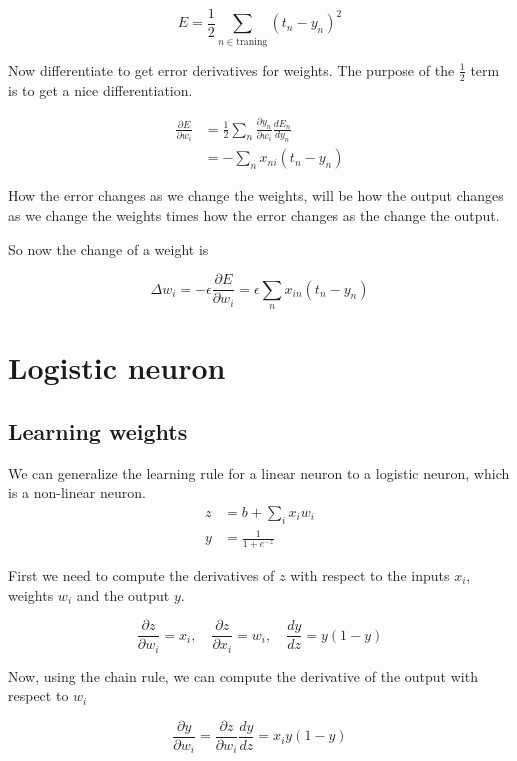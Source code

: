 \documentclass{article}
\begin{document}
\[
    E=\frac{1}{2} \sum_{n\in \text{traning}} {(t_n - y_n)}^2
\]

Now differentiate to get error derivatives for weights. The purpose of the \(\frac{1}{2}\) term is to get a nice differentiation.

\begin{align*}
    \frac{\partial E}{\partial w_i}&=
    \frac{1}{2} \sum_n \frac{\partial y_n}{\partial w_i} \frac{dE_n}{dy_n} \\
    &= - \sum_n x_{ni} (t_n-y_n)
\end{align*}

How the error changes as we change the weights, will be how the output changes as we change the weights
times how the error changes as the change the output.

So now the change of a weight is

\[
    \Delta w_i=-\epsilon \frac{\partial E}{\partial w_i} = \epsilon \sum_n x_{in}(t_n-y_n)
\]



\pagebreak

\section{Logistic neuron}

\subsection{Learning weights}

We can generalize the learning rule for a linear neuron to a logistic neuron, which is a non-linear neuron.
\\
\begin{align*}    
    z&=b+\sum_{i} x_i w_i \\
    y&=\frac{1}{1+e^{-z}}
\end{align*}

First we need to compute the derivatives of \(z\) with respect to the inputs \(x_i\), weights \(w_i\) and the output \(y\).

\[
    \frac{\partial z}{\partial w_i} = x_i,
    \quad
    \frac{\partial z}{\partial x_i} = w_i,
    \quad
    \frac{dy}{dz}=y(1-y)
\]

Now, using the chain rule, we can compute the derivative of the output with respect to \(w_i\)

\[
    \frac{\partial y}{\partial w_i}=\frac{\partial z}{\partial w_i}\frac{dy}{dz}=x_i y(1-y)
\]
\end{document}
